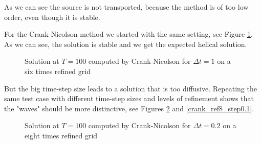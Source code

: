 \documentclass[a4paper, 11pt, twoside]{article}
\begin{document}
As we can see the source is not transported, because the method is of too low order, even though it is stable.

For the Crank-Nicolson method we started with the same setting, see Figure \ref{crank_ref6_step1}. As we can see, the solution is stable and we get the expected helical solution.

\begin{figure}[htbp]
\begin{center}
\caption{Solution at $T = 100$ computed by Crank-Nicolson for $\Delta t = 1$ on a six times refined grid}
\label{crank_ref6_step1}
\end{center}
\end{figure}

But the big time-step size leads to a solution that is too diffusive. Repeating the same test case with different time-step sizes and levels of refinement shows that the "waves" should be more distinctive, see Figures \ref{crank_ref6_step0.1} and \ref{crank_ref8_step0.1}.

\begin{figure}[htbp]
\begin{center}
\caption{Solution at $T = 100$ computed by Crank-Nicolson for $\Delta t = 0.2$ on a eight times refined grid}
\label{crank_ref6_step0.1}
\end{center}
\end{figure}
\end{document}
